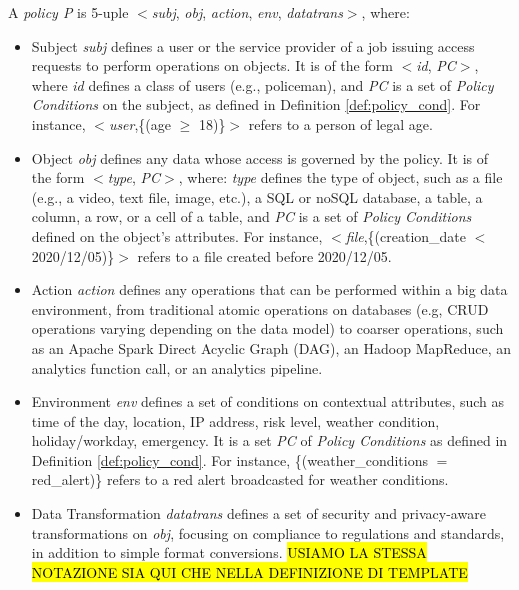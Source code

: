 \begin{definition}[Policy]\label{def:policy_rule}
  A {\it policy P} is 5-uple $<$\textit{subj}, \textit{obj}, \textit{action}, \textit{env}, \textit{datatrans}$>$, where:
  \begin{itemize}
    \item Subject \textit{subj} defines a user or the service provider of a job issuing access requests to perform operations on objects. It is of the form $<$\emph{id}, \emph{PC}$>$, where \emph{id} defines a class of users (e.g., policeman), and \emph{PC} is a set of \emph{Policy Conditions} on the subject, as defined in Definition \ref{def:policy_cond}. For instance, $<$\emph{user},\{(age $\geq$ 18)\}$>$ refers to a person of legal age.

    \item Object \textit{obj} defines any data whose access is governed by the policy. It is of the form $<$\emph{type}, \emph{PC}$>$, where: \emph{type} defines the type of object, such as a file (e.g., a video, text file, image, etc.), a SQL or noSQL database, a table, a column, a row, or a cell of a table, and \emph{PC} is a set of \emph{Policy Conditions} defined on the object's attributes. For instance, $<$\emph{file},\{(creation\_date $<$ 2020/12/05)\}$>$ refers to a file created before 2020/12/05.

    \item Action \textit{action} defines any operations that can be performed within a big data environment, from traditional atomic operations on databases (e.g, CRUD operations varying depending on the data model) to coarser operations, such as an Apache Spark Direct Acyclic Graph (DAG), an Hadoop MapReduce, an analytics function call, or an analytics pipeline.

    \item Environment \textit{env} defines a set of conditions on contextual attributes, such as time of the day, location, IP address, risk level, weather condition, holiday/workday, emergency. It is a set \emph{PC} of
          \emph{Policy Conditions} as defined in Definition \ref{def:policy_cond}.
          For instance, \{(weather\_conditions $=$ red\_alert)\} refers to a red alert broadcasted for weather conditions.

    \item Data Transformation \textit{datatrans} defines a set of security and privacy-aware transformations on \textit{obj}, focusing on compliance to regulations and standards, in addition to simple format conversions. \hl{USIAMO LA STESSA NOTAZIONE SIA QUI CHE NELLA DEFINIZIONE DI TEMPLATE}
  \end{itemize}
\end{definition}

